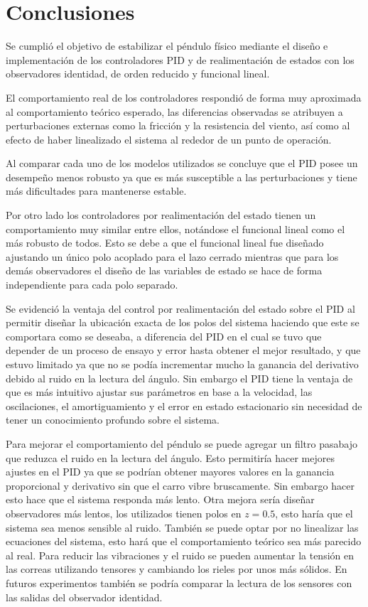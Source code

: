 \section{Conclusiones}

Se cumplió el objetivo de estabilizar el péndulo físico mediante el diseño e implementación de los controladores PID y de realimentación de estados con los observadores identidad, de orden reducido y funcional lineal.

El comportamiento real de los controladores respondió de forma muy aproximada al comportamiento teórico esperado, las diferencias observadas se atribuyen a perturbaciones externas como la fricción y la resistencia del viento, así como al efecto de haber linealizado el sistema al rededor de un punto de operación.

Al comparar cada uno de los modelos utilizados se concluye que el PID posee un desempeño menos robusto ya que es más susceptible a las perturbaciones y tiene más dificultades para mantenerse estable.

Por otro lado los controladores por realimentación del estado tienen un comportamiento muy similar entre ellos, notándose el funcional lineal como el más robusto de todos. Esto se debe a que el funcional lineal fue diseñado ajustando un único polo acoplado para el lazo cerrado mientras que para los demás observadores el diseño de las variables de estado se hace de forma independiente para cada polo separado.

Se evidenció la ventaja del control por realimentación del estado sobre el PID al permitir diseñar la ubicación exacta de los polos del sistema haciendo que este se comportara como se deseaba, a diferencia del PID en el cual se tuvo que depender de un proceso de ensayo y error hasta obtener el mejor resultado, y que estuvo limitado ya que no se podía incrementar mucho la ganancia del derivativo debido al ruido en la lectura del ángulo. Sin embargo el PID tiene la ventaja de que es más intuitivo ajustar sus parámetros en base a la velocidad, las oscilaciones, el amortiguamiento y el error en estado estacionario sin necesidad de tener un conocimiento profundo sobre el sistema.

Para mejorar el comportamiento del péndulo se puede agregar un filtro pasabajo que reduzca el ruido en la lectura del ángulo. Esto permitiría hacer mejores ajustes en el PID ya que se podrían obtener mayores valores en la ganancia proporcional y derivativo sin que el carro vibre bruscamente. Sin embargo hacer esto hace que el sistema responda más lento. Otra mejora sería diseñar observadores más lentos, los utilizados tienen polos en $z = 0.5$, esto haría que el sistema sea menos sensible al ruido. También se puede optar por no linealizar las ecuaciones del sistema, esto hará que el comportamiento teórico sea más parecido al real. Para reducir las vibraciones y el ruido se pueden aumentar la tensión en las correas utilizando tensores y cambiando los rieles por unos más sólidos. En futuros experimentos también se podría comparar la lectura de los sensores con las salidas del observador identidad.
